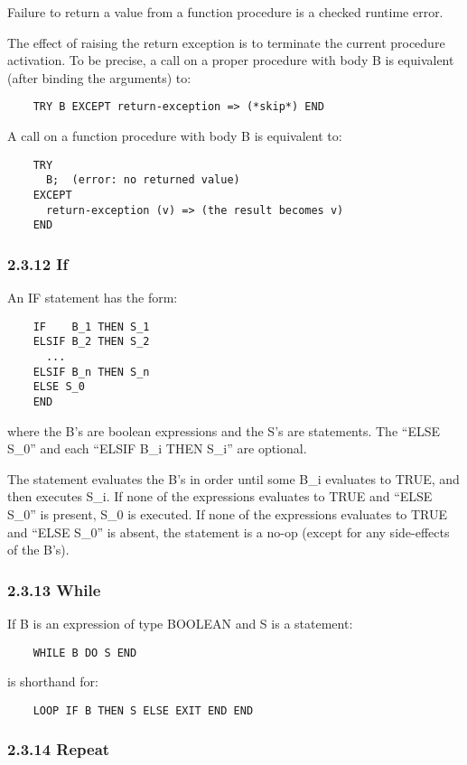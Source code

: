 \documentclass[10pt]{article}
\begin{document}
Failure to return a value from a function procedure is a checked runtime
error.

The effect of raising the return exception is to terminate the current
procedure activation. To be precise, a call on a proper procedure with body B
is equivalent (after binding the arguments) to:
\begin{verbatim}
    TRY B EXCEPT return-exception => (*skip*) END
\end{verbatim}
A call on a function procedure with body B is equivalent to:
\begin{verbatim}
    TRY
      B;  (error: no returned value)
    EXCEPT
      return-exception (v) => (the result becomes v)
    END
\end{verbatim}

\subsubsection*{2.3.12 If}

An IF statement has the form:
\begin{verbatim}
    IF    B_1 THEN S_1
    ELSIF B_2 THEN S_2
      ...
    ELSIF B_n THEN S_n
    ELSE S_0
    END
\end{verbatim}

where the B's are boolean expressions and the S's are statements. The ``ELSE S\_0'' and each ``ELSIF B\_i THEN S\_i'' are optional.

The statement evaluates the B's in order until some B\_i evaluates to TRUE,
and then executes S\_i. If none of the expressions evaluates to TRUE and
``ELSE S\_0'' is present, S\_0 is executed. If none of the expressions
evaluates to TRUE and ``ELSE S\_0'' is absent, the statement is a no-op
(except for any side-effects of the B's).

\subsubsection*{2.3.13 While}

If B is an expression of type BOOLEAN and S is a statement:
\begin{verbatim}
    WHILE B DO S END
\end{verbatim}
is shorthand for:
\begin{verbatim}
    LOOP IF B THEN S ELSE EXIT END END
\end{verbatim}

\subsubsection*{2.3.14 Repeat}
\end{document}
